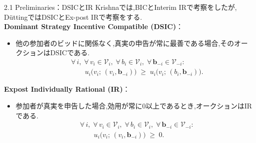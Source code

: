 \documentclass[dvipdfmx,autodetect-engine]{beamer}
\begin{document}
\begin{frame}{2.1  Preliminaries：DSICとIR}
  \small
  Krishnaでは,BICとInterim IRで考察をしたが,\\
  DüttingではDSICとEx-post IRで考察をする.\\
  \textbf{Dominant Strategy Incentive Compatible (DSIC)}：
  \begin{itemize}
    \item 他の参加者のビッドに関係なく,真実の申告が常に最善である場合,そのオークションはDSICである.
    \begin{equation*}
    \begin{aligned}
    &\forall\,i,\;\forall\,v_i\in\mathcal{V}_i,\;
      \forall\,b_i\in\mathcal{V}_i,\;
      \forall\,\mathbf{b}_{-i}\in\mathcal{V}_{-i}:\\[2pt]
    &\qquad
      u_i\!\bigl(v_i;\,(v_i,\mathbf{b}_{-i})\bigr)
      \;\ge\;
      u_i\!\bigl(v_i;\,(b_i,\mathbf{b}_{-i})\bigr).
    \end{aligned}
    \end{equation*}
  \end{itemize}

  \vspace{0.5em}
  \textbf{Ex\textendash{}post Individually Rational (IR)}：
  \begin{itemize}
    \item 参加者が真実を申告した場合,効用が常に0以上であるとき,オークションはIRである.
    \begin{equation*}
    \begin{aligned}
    &\forall\,i,\;\forall\,v_i\in\mathcal{V}_i,\;
      \forall\,b_i\in\mathcal{V}_i,\;
      \forall\,\mathbf{b}_{-i}\in\mathcal{V}_{-i}:\\[2pt]
    &\qquad
      u_i\!\bigl(v_i;\,(v_i,\mathbf{b}_{-i})\bigr)\;\ge\;0.
    \end{aligned}
    \end{equation*}
  \end{itemize}
\end{frame}
\end{document}

